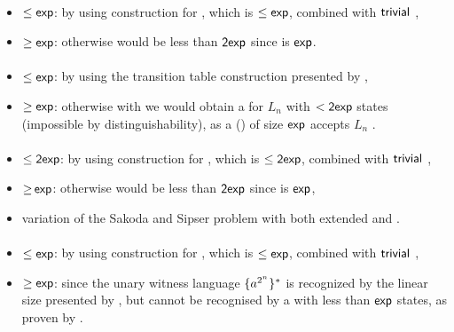 \paragraph{\OLA{}\tto\TNFA}
\begin{itemize}
	\item $\le\Cexp$: by using construction for \hyperref[cost:1LAto1NFA]{\OLA{}\tto\ONFA}, which is $\le\Cexp$, combined with $\Ctriv$ \ONFA{}\tto\TNFA,
	\item $\ge\Cexp$: otherwise \hyperref[cost:1LAto1DFA]{\OLA{}\tto\ODFA} would be less than $\Cdexp$ since \TNFA{}\tto\ODFA is $\Cexp$.
\end{itemize}
\paragraph{\ODLA{}\tto\ODFA}\label{cost:1DLAto1DFA}
\begin{itemize}
	\item $\le\Cexp$: by using the transition table construction presented by ,
	\item $\ge\Cexp$: otherwise with \hyperref[cost:1DLAto1DFA]{\ODLA{}\tto\ODFA} we would obtain a \ODFA for $L_n$ with $<\Cdexp$ states (impossible by distinguishability), as a \ODLA (\TDFA) of size $\Cexp$ accepts $L_n$ \cite{PigPis14}.
\end{itemize}
\paragraph{\OLA{}\tto\ODLA}
\begin{itemize}
	\item $\le\Cdexp$: by using construction for \hyperref[cost:1LAto1DFA]{\OLA{}\tto\ODFA}, which is $\le\Cdexp$, combined with $\Ctriv$ \ODFA{}\tto\ODLA,
	\item $\ge\hspacingfix{-1pt}\Cexp$: otherwise \hyperref[cost:1LAto1DFA]{\OLA{}\tto\ODFA} would be less than $\Cdexp$ since \ODLA{}\tto\ODFA is $\Cexp$,
	\item variation of the Sakoda and Sipser problem with both extended \TNFA and \TDFA.
\end{itemize}
\paragraph{\ODLA{}\tto\TNFA}\label{cost:1DLAto2NFA}
\begin{itemize}
	\item $\le\Cexp$: by using construction for \hyperref[cost:1DLAto1DFA]{\ODLA{}\tto\ODFA}, which is $\le\Cexp$, combined with $\Ctriv$ \ODFA{}\tto\TNFA,
	\item $\ge\Cexp$: since the unary witness language $\set{a^{2^n}}\star$ is recognized by the linear size \ODLA presented by , but cannot be recognised by a \TNFA with less than $\Cexp$ states, as proven by .
\end{itemize}

